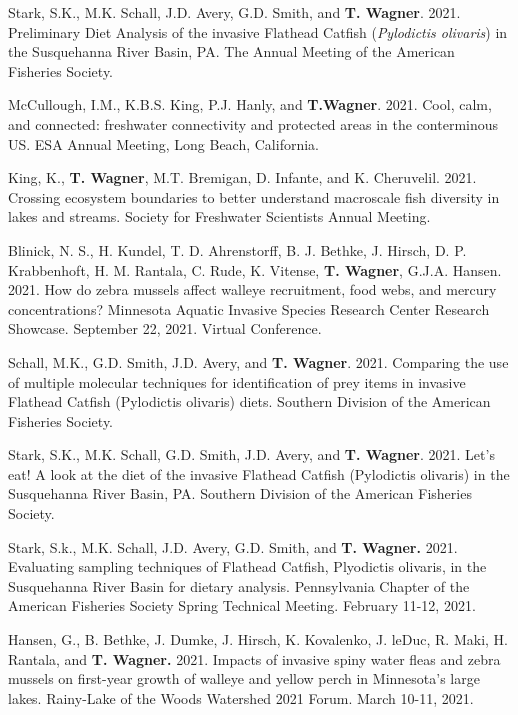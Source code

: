 \documentclass[10pt]{article}
\begin{document}
\begin{flushleft}
\begin{etaremune}
\item Stark, S.K., M.K. Schall, J.D. Avery, G.D. Smith, and \textbf{T. Wagner}. 2021. Preliminary Diet Analysis of the invasive Flathead Catfish (\textit{Pylodictis olivaris}) in the Susquehanna River Basin, PA. The Annual Meeting of the American Fisheries Society.

\item McCullough, I.M., K.B.S. King, P.J. Hanly, and \textbf{T.Wagner}. 2021. Cool, calm, and connected: freshwater connectivity and protected areas in the conterminous US. ESA Annual Meeting, Long Beach, California.

\item King, K., \textbf{T. Wagner}, M.T. Bremigan, D. Infante, and K. Cheruvelil. 2021. Crossing ecosystem boundaries to better understand macroscale fish diversity in lakes and streams. Society for Freshwater Scientists Annual Meeting.

\item Blinick, N. S., H. Kundel, T. D. Ahrenstorff, B. J. Bethke, J. Hirsch, D. P. Krabbenhoft, H. M. Rantala, C. Rude, K. Vitense, \textbf{T. Wagner}, G.J.A. Hansen.  2021. How do zebra mussels affect walleye recruitment, food webs, and mercury concentrations? Minnesota Aquatic Invasive Species Research Center Research Showcase. September 22, 2021. Virtual Conference. 

\item Schall, M.K., G.D. Smith, J.D. Avery, and \textbf{T. Wagner}. 2021. Comparing the use of multiple molecular techniques for identification of prey items in invasive Flathead Catfish (Pylodictis olivaris) diets. Southern Division of the American Fisheries Society.

\item Stark, S.K., M.K. Schall, G.D. Smith, J.D. Avery, and \textbf{T. Wagner}. 2021. Let’s eat! A look at the diet of the invasive Flathead Catfish (Pylodictis olivaris) in the Susquehanna River Basin, PA. Southern Division of the American Fisheries Society.

\item Stark, S.k., M.K. Schall, J.D. Avery, G.D. Smith, and \textbf{T. Wagner.} 2021. Evaluating sampling techniques of Flathead Catfish, Plyodictis olivaris, in the Susquehanna River Basin for dietary analysis. Pennsylvania Chapter of the American Fisheries Society Spring Technical Meeting. February 11-12, 2021.

\item Hansen, G., B. Bethke, J. Dumke, J. Hirsch, K. Kovalenko, J. leDuc, R. Maki, H. Rantala, and \textbf{T. Wagner.} 2021. Impacts of invasive spiny water fleas and zebra mussels on first-year growth of walleye and yellow perch in Minnesota’s large lakes. Rainy-Lake of the Woods Watershed 2021 Forum. March 10-11, 2021.


\end{etaremune}
\end{flushleft}
\end{document}

